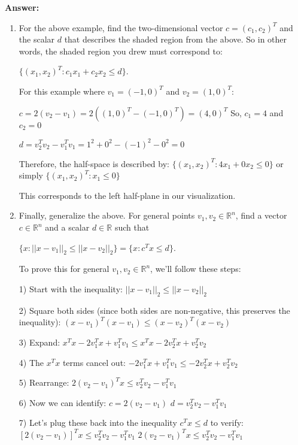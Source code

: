 \documentclass{article}
\newenvironment{answer}
    {\par\noindent\textbf{Answer:}\par}
    {\par}
\begin{document}
\begin{enumerate}
\begin{answer}
\begin{enumerate}
        \item For the above example, find the two-dimensional vector $c = (c_1, c_2)^T$ and the scalar $d$ that describes the shaded region from the above. So in other words, the shaded region you drew must correspond to:
        
        $\{(x_1, x_2)^T : c_1x_1 + c_2x_2 \leq d\}$.

        For this example where $v_1 = (-1, 0)^T$ and $v_2 = (1, 0)^T$:
        
        $c = 2(v_2 - v_1) = 2((1, 0)^T - (-1, 0)^T) = (4, 0)^T$
        So, $c_1 = 4$ and $c_2 = 0$

        $d = v_2^Tv_2 - v_1^Tv_1 = 1^2 + 0^2 - (-1)^2 - 0^2 = 0$
        
        Therefore, the half-space is described by:
        $\{(x_1, x_2)^T : 4x_1 + 0x_2 \leq 0\}$ or simply $\{(x_1, x_2)^T : x_1 \leq 0\}$
        
        This corresponds to the left half-plane in our visualization.

        \item Finally, generalize the above. For general points $v_1, v_2 \in \mathbb{R}^n$, find a vector $c \in \mathbb{R}^n$ and a scalar $d \in \mathbb{R}$ such that
        
        $\{x : ||x - v_1||_2 \leq ||x - v_2||_2\} = \{x : c^T x \leq d\}$.

        To prove this for general $v_1, v_2 \in \mathbb{R}^n$, we'll follow these steps:

        1) Start with the inequality: $||x - v_1||_2 \leq ||x - v_2||_2$

        2) Square both sides (since both sides are non-negative, this preserves the inequality):
        $(x - v_1)^T(x - v_1) \leq (x - v_2)^T(x - v_2)$

        3) Expand:
        $x^Tx - 2v_1^Tx + v_1^Tv_1 \leq x^Tx - 2v_2^Tx + v_2^Tv_2$

        4) The $x^Tx$ terms cancel out:
        $-2v_1^Tx + v_1^Tv_1 \leq -2v_2^Tx + v_2^Tv_2$

        5) Rearrange:
        $2(v_2 - v_1)^Tx \leq v_2^Tv_2 - v_1^Tv_1$

        6) Now we can identify:
        $c = 2(v_2 - v_1)$
        $d = v_2^Tv_2 - v_1^Tv_1$

        7) Let's plug these back into the inequality $c^T x \leq d$ to verify:
        $[2(v_2 - v_1)]^T x \leq v_2^Tv_2 - v_1^Tv_1$
        $2(v_2 - v_1)^T x \leq v_2^Tv_2 - v_1^Tv_1$


\end{enumerate}
\end{answer}
\end{enumerate}
\end{document}
